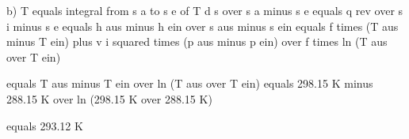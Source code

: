 b) T equals integral from s a to s e of T d s over s a minus s e equals q rev over s i minus s e equals h aus minus h ein over s aus minus s ein equals f times (T aus minus T ein) plus v i squared times (p aus minus p ein) over f times ln (T aus over T ein)

equals T aus minus T ein over ln (T aus over T ein) equals 298.15 K minus 288.15 K over ln (298.15 K over 288.15 K)

equals 293.12 K